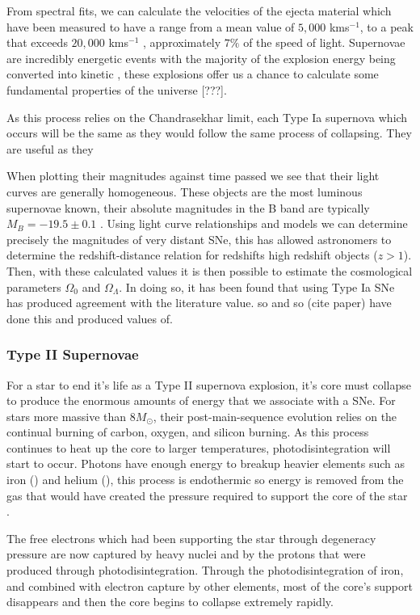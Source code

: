 \documentclass[twocolumn]{revtex4}
\begin{document}
From spectral fits, we can calculate the velocities of the ejecta material which have been measured to have a range from a mean value of $5,000$ kms$^{-1}$, to a peak that exceeds $20,000$ kms$^{-1}$ \cite{ia_vel}, approximately $7\%$ of the speed of light. Supernovae are incredibly energetic events with the majority of the explosion energy being converted into kinetic \cite{posn}, these explosions offer us a chance to calculate some fundamental properties of the universe [???].

As this process relies on the Chandrasekhar limit, each Type Ia supernova which occurs will be the same as they would follow the same process of collapsing. They are useful as they  

When plotting their magnitudes against time passed we see that their light curves are generally homogeneous. These objects are the most luminous supernovae known, their absolute magnitudes in the B band are typically $M_B = -19.5 \pm 0.1$ \cite{posn}. Using light curve relationships and models we can determine precisely the magnitudes of very distant SNe, this has allowed astronomers to determine the redshift-distance relation for redshifts high redshift objects ($z>1$). Then, with these calculated values it is then possible to estimate the cosmological parameters $\Omega_0$ and $\Omega_\Lambda$. In doing so, it has been found that using Type Ia SNe has produced agreement with the literature value. so and so (cite paper) have done this and produced values of. 

\vspace{-3ex}
\subsubsection{Type II Supernovae}
\vspace{-2ex}
For a star to end it's life as a Type II supernova explosion, it's core must collapse to produce the enormous amounts of energy that we associate with a SNe. For stars more massive than $8 M_{\odot}$, their post-main-sequence evolution relies on the continual burning of carbon, oxygen, and silicon burning. As this process continues to heat up the core to larger temperatures, photodisintegration will start to occur. Photons have enough energy to breakup heavier elements such as iron () and helium (), this process is endothermic so energy is removed from the gas that would have created the pressure required to support the core of the star \cite{mod_ast}. 

The free electrons which had been supporting the star through degeneracy pressure are now captured by heavy nuclei and by the protons that were produced through photodisintegration. Through the photodisintegration of iron, and combined with electron capture by other elements, most of the core's support disappears and then the core begins to collapse extremely rapidly. 
\end{document}
